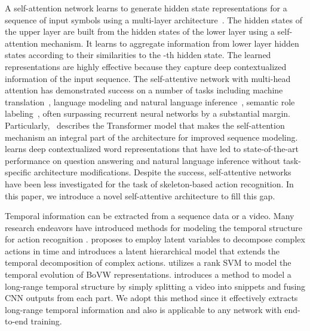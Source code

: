 \documentclass[10pt,twocolumn,letterpaper]{article}
\begin{document}
A self-attention network learns to generate hidden state representations for a sequence of input symbols using a multi-layer architecture~\cite{related_transformer}. 
The hidden states of the upper layer are built from the hidden states of the lower layer using a self-attention mechanism.
It learns to aggregate information from lower layer hidden states according to their similarities to the -th hidden state.
The learned representations are highly effective because they capture deep contextualized information of the input sequence.
The self-attentive network with multi-head attention has demonstrated success on a number of tasks including machine translation~\cite{related_transformer,Tang:2018}, language modeling and natural language inference~\cite{related_BERT}, semantic role labeling~\cite{Strubell:2018}, often surpassing recurrent neural networks by a substantial margin. 
Particularly,~\cite{related_transformer} describes the Transformer model that makes the self-attention mechanism an integral part of the architecture for improved sequence modeling. 
\cite{related_BERT} learns deep contextualized word representations that have led to state-of-the-art performance on question answering and natural language inference without task-specific architecture modifications. 
Despite the success, self-attentive networks have been less investigated for the task of skeleton-based action recognition. In this paper, we introduce a novel self-attentive architecture to fill this gap.



Temporal information can be extracted from a sequence data or a video. Many research endeavors have introduced methods for modeling the temporal structure for action recognition \cite{related_ar1, related_ar2, related_ar3}. \cite{related_ar1} proposes to employ latent variables to decompose complex actions in time and \cite{related_ar2} introduces a latent hierarchical model that extends the temporal decomposition of complex actions. \cite{related_ar3} utilizes a rank SVM to model the temporal evolution of BoVW representations. \cite{intro_TSN} introduces a method to model a long-range temporal structure by simply splitting a video into snippets and fusing CNN outputs from each part. We adopt this method since it effectively extracts long-range temporal information and also is applicable to any network with end-to-end training.
\end{document}
